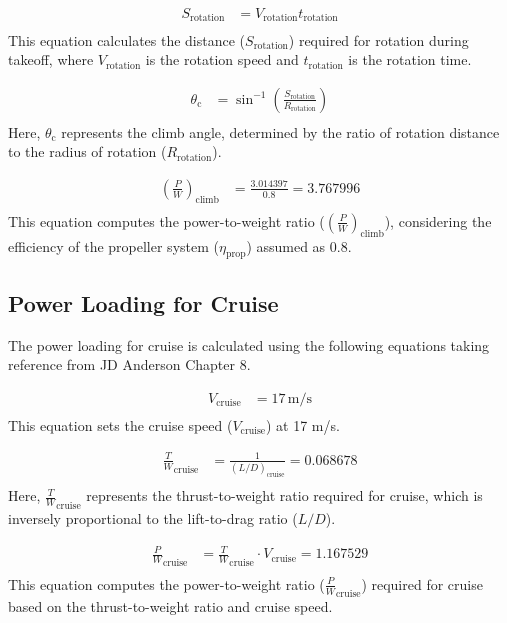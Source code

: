 \documentclass[12 pt]{article}
\begin{document}
\begin{align*}
S_{\text{rotation}} &= V_{\text{rotation}} t_{\text{rotation}} \tag{3.14} \\
\end{align*}
This equation calculates the distance ($S_{\text{rotation}}$) required for rotation during takeoff, where $V_{\text{rotation}}$ is the rotation speed and $t_{\text{rotation}}$ is the rotation time.

\begin{align*}
\theta_{\text{c}} &= \sin^{-1}\left(\frac{S_{\text{rotation}}}{R_{\text{rotation}}}\right) \tag{3.15} \\
\end{align*}
Here, $\theta_{\text{c}}$ represents the climb angle, determined by the ratio of rotation distance to the radius of rotation ($R_{\text{rotation}}$).

\begin{align*}
\left(\frac{P}{W}\right)_{\text{climb}} &= \frac{3.014397}{0.8} = 3.767996 \tag{3.16} \\
\end{align*}
This equation computes the power-to-weight ratio ($\left(\frac{P}{W}\right)_{\text{climb}}$), considering the efficiency of the propeller system ($\eta_{\text{prop}}$) assumed as 0.8.


\subsection{{Power Loading for Cruise}}

The power loading for cruise is calculated using the following equations taking reference from JD Anderson Chapter 8.

\begin{align*}
V_{\text{cruise}} &= 17 \, \text{m/s} \tag{3.17} \\
\end{align*}
This equation sets the cruise speed ($V_{\text{cruise}}$) at 17 m/s.

\begin{align*}
\frac{T}{W}_{\text{cruise}} &= \frac{1}{(L/D)_{\text{cruise}}} = 0.068678 \tag{3.18} \\
\end{align*}
Here, $\frac{T}{W}_{\text{cruise}}$ represents the thrust-to-weight ratio required for cruise, which is inversely proportional to the lift-to-drag ratio ($L/D$).

\begin{align*}
\frac{P}{W}_{\text{cruise}} &= \frac{T}{W}_{\text{cruise}} \cdot V_{\text{cruise}} = 1.167529 \tag{3.19} \\
\end{align*}
This equation computes the power-to-weight ratio ($\frac{P}{W}_{\text{cruise}}$) required for cruise based on the thrust-to-weight ratio and cruise speed.
\end{document}
